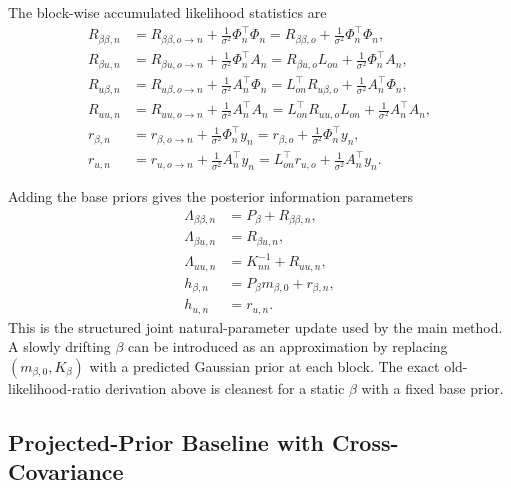 \documentclass[12pt]{article}
\begin{document}
The block-wise accumulated likelihood statistics are
\begin{align}
    R_{\beta\beta,n}
    &=R_{\beta\beta,o\rightarrow n}+\frac{1}{\sigma^2}\Phi_n^\top\Phi_n
      =R_{\beta\beta,o}+\frac{1}{\sigma^2}\Phi_n^\top\Phi_n,
    \label{eq:joint_accum_Rbb}\\
    R_{\beta u,n}
    &=R_{\beta u,o\rightarrow n}+\frac{1}{\sigma^2}\Phi_n^\top A_n
      =R_{\beta u,o}L_{on}+\frac{1}{\sigma^2}\Phi_n^\top A_n,
    \label{eq:joint_accum_Rbu}\\
    R_{u\beta,n}
    &=R_{u\beta,o\rightarrow n}+\frac{1}{\sigma^2}A_n^\top\Phi_n
      =L_{on}^\top R_{u\beta,o}+\frac{1}{\sigma^2}A_n^\top\Phi_n,
    \label{eq:joint_accum_Rub}\\
    R_{uu,n}
    &=R_{uu,o\rightarrow n}+\frac{1}{\sigma^2}A_n^\top A_n
      =L_{on}^\top R_{uu,o}L_{on}+\frac{1}{\sigma^2}A_n^\top A_n,
    \label{eq:joint_accum_Ruu}\\
    r_{\beta,n}
    &=r_{\beta,o\rightarrow n}+\frac{1}{\sigma^2}\Phi_n^\top y_n
      =r_{\beta,o}+\frac{1}{\sigma^2}\Phi_n^\top y_n,
    \label{eq:joint_accum_rb}\\
    r_{u,n}
    &=r_{u,o\rightarrow n}+\frac{1}{\sigma^2}A_n^\top y_n
      =L_{on}^\top r_{u,o}+\frac{1}{\sigma^2}A_n^\top y_n.
    \label{eq:joint_accum_ru}
\end{align}

Adding the base priors gives the posterior information parameters
\begin{align}
    \Lambda_{\beta\beta,n}
    &=P_\beta+R_{\beta\beta,n},
    \label{eq:joint_Lbb_total}\\
    \Lambda_{\beta u,n}
    &=R_{\beta u,n},
    \label{eq:joint_Lbu_total}\\
    \Lambda_{uu,n}
    &=K_{nn}^{-1}+R_{uu,n},
    \label{eq:joint_Luu_total}\\
    h_{\beta,n}
    &=P_\beta m_{\beta,0}+r_{\beta,n},
    \label{eq:joint_hb_total}\\
    h_{u,n}
    &=r_{u,n}.
    \label{eq:joint_hu_total}
\end{align}
This is the structured joint natural-parameter update used by the main method.
A slowly drifting $\beta$ can be introduced as an approximation by replacing
$(m_{\beta,0},K_\beta)$ with a predicted Gaussian prior at each block. The exact
old-likelihood-ratio derivation above is cleanest for a static $\beta$ with a fixed
base prior.

\subsection{Projected-Prior Baseline with Cross-Covariance}
\label{subsec:projected_prior_approximation}
\end{document}
